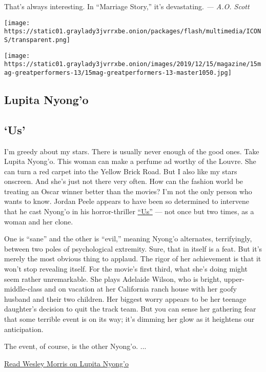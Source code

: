 That's always interesting. In ``Marriage Story,'' it's devastating.
\emph{--- A.O. Scott}

\texttt{[image: https://static01.graylady3jvrrxbe.onion/packages/flash/multimedia/ICONS/transparent.png]}

\texttt{[image: https://static01.graylady3jvrrxbe.onion/images/2019/12/15/magazine/15mag-greatperformers-13/15mag-greatperformers-13-master1050.jpg]}

\hypertarget{lupita-nyongo}{%
\subsection{Lupita Nyong'o}\label{lupita-nyongo}}

\hypertarget{us}{%
\subsection{`Us'}\label{us}}

I'm greedy about my stars. There is usually never enough of the good
ones. Take Lupita Nyong'o. This woman can make a perfume ad worthy of
the Louvre. She can turn a red carpet into the Yellow Brick Road. But I
also like my stars onscreen. And she's just not there very often. How
can the fashion world be treating an Oscar winner better than the
movies? I'm not the only person who wants to know. Jordan Peele appears
to have been so determined to intervene that he cast Nyong'o in his
horror-thriller
\href{https://www.nytimes3xbfgragh.onion/2019/03/20/movies/us-movie-review.html}{``Us''}
--- not once but two times, as a woman and her clone.

One is ``sane'' and the other is ``evil,'' meaning Nyong'o alternates,
terrifyingly, between two poles of psychological extremity. Sure, that
in itself is a feat. But it's merely the most obvious thing to applaud.
The rigor of her achievement is that it won't stop revealing itself. For
the movie's first third, what she's doing might seem rather
unremarkable. She plays Adelaide Wilson, who is bright,
upper-middle-class and on vacation at her California ranch house with
her goofy husband and their two children. Her biggest worry appears to
be her teenage daughter's decision to quit the track team. But you can
sense her gathering fear that some terrible event is on its way; it's
dimming her glow as it heightens our anticipation.

The event, of course, is the other Nyong'o. ...

\href{https://www.nytimes3xbfgragh.onion/interactive/2019/12/09/magazine/lupita-nyongo-us.html}{Read
Wesley Morris on Lupita Nyong'o}

